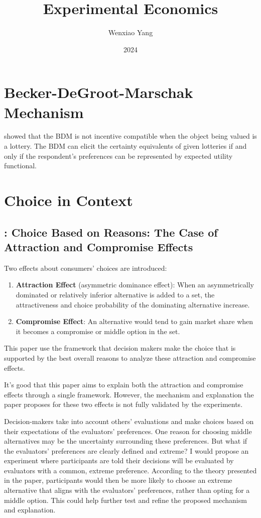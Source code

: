 \documentclass[11pt]{elegantbook}
\title{Experimental Economics}
\author{Wenxiao Yang}
\institute{Haas School of Business, University of California Berkeley}
\date{2024}
\begin{document}
\maketitle

\frontmatter
\tableofcontents

\mainmatter



\chapter{Becker-DeGroot-Marschak Mechanism}
\cite{karni1987preference} showed that the BDM is not incentive compatible when the object being valued is a lottery. The BDM can elicit the certainty equivalents of given lotteries if and only if the respondent's preferences can be represented by expected utility functional.


\chapter{Choice in Context}
\section{\cite{simonson1989choice}: Choice Based on Reasons: The Case of Attraction and Compromise Effects}
Two effects about consumers' choices are introduced:
\begin{enumerate}
    \item \textbf{Attraction Effect} (asymmetric dominance effect): When an asymmetrically dominated or relatively inferior alternative is added to a set, the attractiveness and choice probability of the dominating alternative increase.
    \item \textbf{Compromise Effect}: An alternative would tend to gain market share when it becomes a compromise or middle option in the set.
\end{enumerate}
This paper use the framework that decision makers make the choice that is supported by the best overall reasons to analyze these attraction and compromise effects.

It’s good that this paper aims to explain both the attraction and compromise effects through a single framework. However, the mechanism and explanation the paper proposes for these two effects is not fully validated by the experiments.

Decision-makers take into account others’ evaluations and make choices based on their expectations of the evaluators’ preferences. One reason for choosing middle alternatives may be the uncertainty surrounding these preferences. But what if the evaluators’ preferences are clearly defined and extreme? I would propose an experiment where participants are told their decisions will be evaluated by evaluators with a common, extreme preference. According to the theory presented in the paper, participants would then be more likely to choose an extreme alternative that aligns with the evaluators’ preferences, rather than opting for a middle option. This could help further test and refine the proposed mechanism and explanation.
\end{document}

